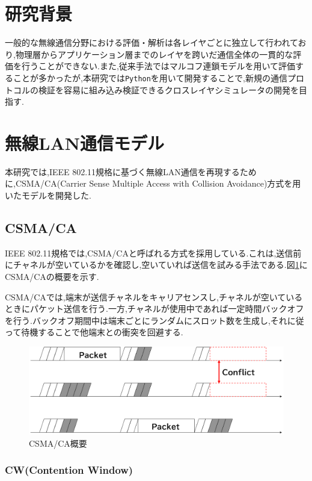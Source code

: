 \documentclass[a4paper, 10pt]{ltjsarticle}
\begin{document}
\section{研究背景}
一般的な無線通信分野における評価・解析は各レイヤごとに独立して行われており,物理層からアプリケーション層までのレイヤを跨いだ通信全体の一貫的な評価を行うことができない.また,従来手法ではマルコフ連鎖モデルを用いて評価することが多かったが,本研究では\texttt{Python}を用いて開発することで,新規の通信プロトコルの検証を容易に組み込み検証できるクロスレイヤシミュレータの開発を目指す.



\section{無線LAN通信モデル}

本研究では,IEEE 802.11規格に基づく無線LAN通信を再現するために,CSMA/CA(Carrier Sense Multiple Access with Collision Avoidance)方式を用いたモデルを開発した.

\subsection{CSMA/CA}

IEEE 802.11規格では,CSMA/CAと呼ばれる方式を採用している.これは,送信前にチャネルが空いているかを確認し,空いていれば送信を試みる手法である.図\ref{CSMA/CA}にCSMA/CAの概要を示す.

CSMA/CAでは,端末が送信チャネルをキャリアセンスし,チャネルが空いているときにパケット送信を行う.一方,チャネルが使用中であれば一定時間バックオフを行う.バックオフ期間中は端末ごとにランダムにスロット数を生成し,それに従って待機することで他端末との衝突を回避する.


\begin{figure}[H]
  \centering
  \includegraphics[width=1\columnwidth]{./assets/csmaca-1.png}
  \caption{CSMA/CA概要}
  \label{CSMA/CA}
\end{figure}

\subsubsection{CW(Contention Window)}
\end{document}
